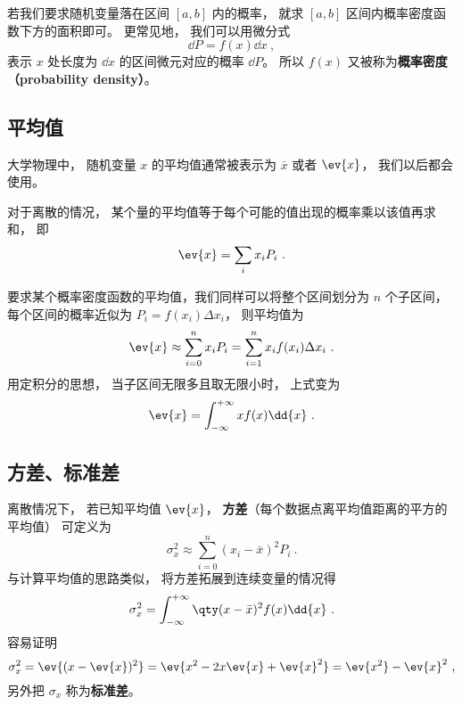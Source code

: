 若我们要求随机变量落在区间 $[a,b]$ 内的概率， 就求 $[a,b]$ 区间内概率密度函数下方的面积即可。 更常见地， 我们可以用微分式
\begin{equation}
\dd{P} = f(x) \dd{x}~,
\end{equation}
表示 $x$ 处长度为 $\dd{x}$ 的区间微元对应的概率 $\dd{P}$。 所以 $f(x)$ 又被称为\textbf{概率密度（probability density）}。

\subsection{平均值}
大学物理中， 随机变量 $x$ 的平均值通常被表示为 $\bar x$ 或者 $\ev{x}$， 我们以后都会使用。

对于离散的情况， 某个量的平均值等于每个可能的值出现的概率乘以该值再求和， 即
\begin{equation}\label{eq_RandF_14}
\ev{x} = \sum_i x_i P_i~.
\end{equation}

要求某个概率密度函数的平均值，我们同样可以将整个区间划分为 $n$ 个子区间， 每个区间的概率近似为 $P_i = f(x_i) \Delta x_i$， 则平均值为
\begin{equation}
\ev{x} \approx \sum_{i=0}^n x_i P_i = \sum_{i=1}^n x_i f(x_i) \Delta x_i~.
\end{equation}
用定积分的思想， 当子区间无限多且取无限小时， 上式变为
\begin{equation}\label{eq_RandF_7}
\ev{x} = \int_{-\infty}^{+\infty} x f(x) \dd{x}~.
\end{equation}

\subsection{方差、标准差}
离散情况下， 若已知平均值 $\ev{x}$， \textbf{方差}（每个数据点离平均值距离的平方的平均值） 可定义为
\begin{equation}
\sigma_x^2 \approx \sum_{i=0}^n (x_i - \bar x)^2 P_i~.
\end{equation}
与计算平均值的思路类似， 将方差拓展到连续变量的情况得
\begin{equation}\label{eq_RandF_6}
\sigma_x^2 = \int_{-\infty}^{+\infty} \qty(x-\bar x)^2 f(x) \dd{x}~.
\end{equation}
容易证明
\begin{equation}\label{eq_RandF_15}
\sigma_x^2=\ev{(x-\ev{x})^2}=\ev{x^2-2x\ev{x}+\ev{x}^2}=\ev{x^2}-\ev{x}^2~,
\end{equation}
另外把 $\sigma_x$ 称为\textbf{标准差}。

